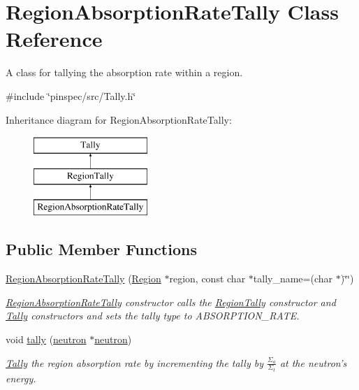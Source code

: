 \hypertarget{classRegionAbsorptionRateTally}{\section{Region\-Absorption\-Rate\-Tally Class Reference}
\label{classRegionAbsorptionRateTally}
}


A class for tallying the absorption rate within a region.  




{\ttfamily \#include \char`\"{}pinspec/src/\-Tally.\-h\char`\"{}}

Inheritance diagram for Region\-Absorption\-Rate\-Tally\-:\begin{figure}[H]
\begin{center}
\leavevmode
\includegraphics[height=3.000000cm]{classRegionAbsorptionRateTally}
\end{center}
\end{figure}
\subsection*{Public Member Functions}
\begin{DoxyCompactItemize}
\item 
\hyperlink{classRegionAbsorptionRateTally_a660ea8cbb625cad4ecb5a64e963a0682}{Region\-Absorption\-Rate\-Tally} (\hyperlink{classRegion}{Region} $\ast$region, const char $\ast$tally\-\_\-name=(char $\ast$)\char`\"{}\char`\"{})
\begin{DoxyCompactList}\small\item\em \hyperlink{classRegionAbsorptionRateTally}{Region\-Absorption\-Rate\-Tally} constructor calls the \hyperlink{classRegionTally}{Region\-Tally} constructor and \hyperlink{classTally}{Tally} constructors and sets the tally type to A\-B\-S\-O\-R\-P\-T\-I\-O\-N\-\_\-\-R\-A\-T\-E. \end{DoxyCompactList}\item 
void \hyperlink{classRegionAbsorptionRateTally_ac4b4c57159d65550e1e67dfb2037fd09}{tally} (\hyperlink{structneutron}{neutron} $\ast$\hyperlink{structneutron}{neutron})
\begin{DoxyCompactList}\small\item\em \hyperlink{classTally}{Tally} the region absorption rate by incrementing the tally by $ \frac{\Sigma_a}{\Sigma_t} $ at the neutron's energy. \end{DoxyCompactList}\end{DoxyCompactItemize}

